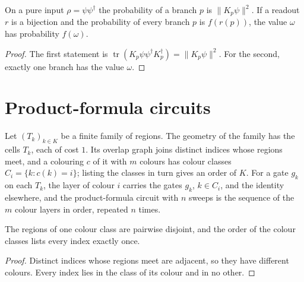 \begin{lemma}
    \label{lem:circuits_prob_pure}
    \leanok
    On a pure input $\rho=\psi\psi^\dagger$ the probability of a branch $p$ is
    $\lVert K_p\psi\rVert^2$. If a readout $r$ is a bijection and the probability of
    every branch $p$ is $f(r(p))$, the value $\omega$ has probability $f(\omega)$.
\end{lemma}
\begin{proof}\leanok
    The first statement is
    $\operatorname{tr}(K_p\psi\psi^\dagger K_p^\dagger)=\lVert K_p\psi\rVert^2$. For the
    second, exactly one branch has the value $\omega$.
\end{proof}

\section{Product-formula circuits}
\label{sec:circuits_product_formula}

\begin{definition}
    \label{def:circuits_product_formula}
    \leanok
    Let $(T_k)_{k\in K}$ be a finite family of regions. The geometry of the family
    has the cells $T_k$, each of cost $1$. Its overlap graph joins distinct indices
    whose regions meet, and a colouring $c$ of it with $m$ colours has colour classes
    $C_i=\{k: c(k)=i\}$; listing the classes in turn gives an order of $K$. For a
    gate $g_k$ on each $T_k$, the layer of colour $i$ carries the gates $g_k$,
    $k\in C_i$, and the identity elsewhere, and the product-formula circuit with $n$
    sweeps is the sequence of the $m$ colour layers in order, repeated $n$ times.
\end{definition}

\begin{lemma}
    \label{lem:circuits_colour_classes}
    \leanok
    The regions of one colour class are pairwise disjoint, and the order of the
    colour classes lists every index exactly once.
\end{lemma}
\begin{proof}\leanok
    Distinct indices whose regions meet are adjacent, so they have different
    colours. Every index lies in the class of its colour and in no other.
\end{proof}

